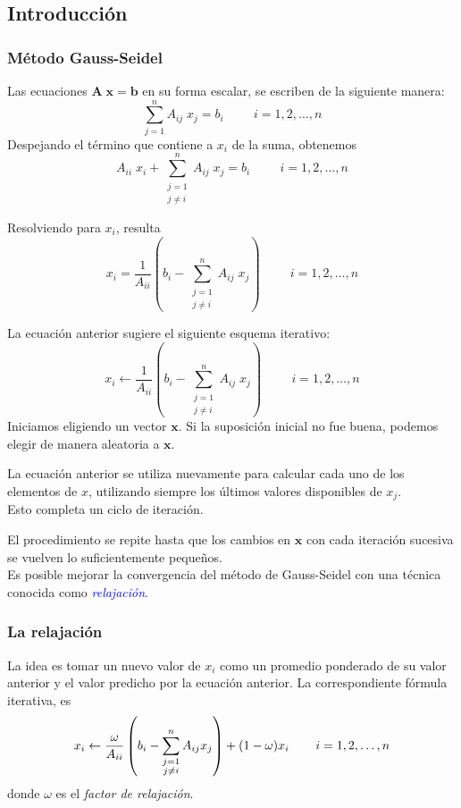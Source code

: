 \subsection{Introducción}
\begin{frame}
\frametitle{Método Gauss-Seidel}
Las ecuaciones $\mathbf{A \; x} = \mathbf{b}$ en su forma escalar, se escriben de la siguiente manera:
\[ \sum_{j=1}^{n} A_{ij} \;  x_{j} = b_{i} \hspace{1cm} i = 1,2,\ldots,n \]
Despejando el término que contiene a $x_{i}$ de la suma, obtenemos
\[ A_{ii} \; x_{i} + \sum_{\substack{j=1 \\ j \neq i}}^{n} A_{ij} \; x_{j} = b_{i} \hspace{1cm} i= 1, 2,\ldots,n \]
\end{frame}
\begin{frame}
Resolviendo para $x_{i}$, resulta
\[ x_{i} = \dfrac{1}{A_{ii}} \left( b_{i} - \sum_{\substack{ j=1 \\ j \neq i}}^{n} A_{ij} \; x_{j} \right) \hspace{1cm} i = 1, 2, \ldots, n \]
\end{frame}
\begin{frame}
La ecuación anterior sugiere el siguiente esquema iterativo:
\[ x_{i}\leftarrow \dfrac{1}{A_{ii}} \left( b_{i} - \sum_{\substack{ j=1 \\ j \neq i}}^{n} A_{ij}  \; x_{j} \right) \hspace{1cm} i = 1, 2, \ldots, n \]
Iniciamos eligiendo un vector $\mathbf{x}$. Si la suposición inicial no fue buena, podemos elegir de manera aleatoria a $\mathbf{x}$.
\end{frame}
\begin{frame}
La ecuación anterior se utiliza nuevamente para calcular cada uno de los elementos de $x$, utilizando siempre los últimos valores disponibles de $x_{j}$.
\\
\bigskip
Esto completa un ciclo de iteración.
\end{frame}
\begin{frame}
El procedimiento se repite hasta que los cambios en $\mathbf{x}$ con cada iteración sucesiva se  vuelven lo suficientemente pequeños.
\\
\medskip
Es posible mejorar la convergencia del método de Gauss-Seidel con una técnica conocida como \emph{\textcolor{blue}{relajación}}.
\end{frame}
\begin{frame}
\frametitle{La relajación}
La idea es tomar un nuevo valor de $x_{i}$ como un promedio ponderado de su valor anterior y el valor predicho por la ecuación anterior. La correspondiente fórmula iterativa, es
\[  x_{i}\leftarrow \dfrac{\omega}{A_{ii}} \left( b_{i} - \sum_{\substack{ j=1 \\ j \neq i}}^{n} A_{ij} x_{j} \right) + (1 - \omega) x_{i} \hspace{0.75cm} i=1,2,\ldots,n \]
donde $\omega$ es el \emph{factor de relajación}.
\end{frame}
